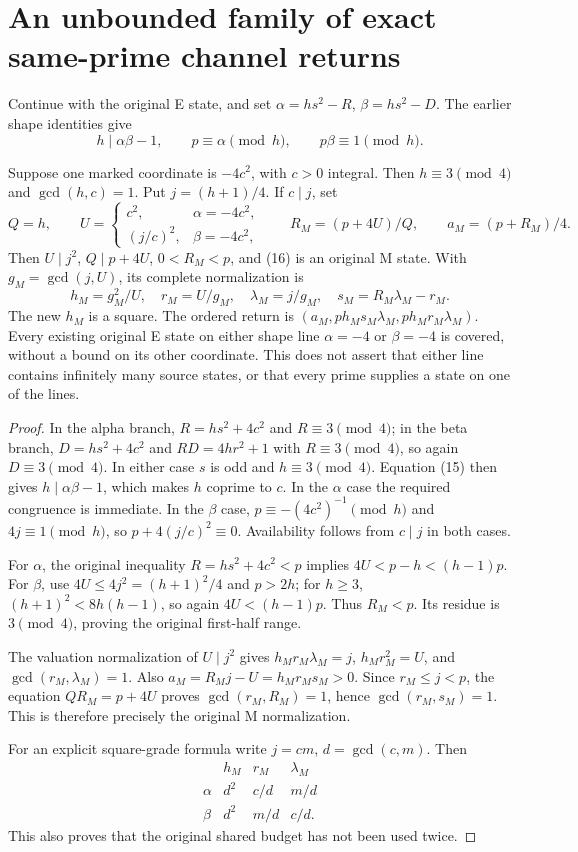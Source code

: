 \section{An unbounded family of exact same-prime channel returns}
Continue with the original E state, and set
$\alpha=hs^2-R$, $\beta=hs^2-D$. The earlier shape identities give
\[
 h\mid\alpha\beta-1,\qquad p\equiv\alpha\pmod h,
 \qquad p\beta\equiv1\pmod h.                         \tag{15}
\]
\begin{theorem}\label{thm:transfer}
Suppose one marked coordinate is $-4c^2$, with $c>0$ integral. Then
$h\equiv3\pmod4$ and $\gcd(h,c)=1$. Put $j=(h+1)/4$.
If $c\mid j$, set
\[
 Q=h,\qquad
 U=\begin{cases}c^2,&\alpha=-4c^2,\\(j/c)^2,&\beta=-4c^2,\end{cases}
 \qquad R_M=(p+4U)/Q,\qquad a_M=(p+R_M)/4.              \tag{16}
\]
Then $U\mid j^2$, $Q\mid p+4U$, $0<R_M<p$, and (16) is an original M state.
With $g_M=\gcd(j,U)$, its complete normalization is
\[
 \boxed{h_M=g_M^2/U,\quad r_M=U/g_M,\quad
 \lambda_M=j/g_M,\quad s_M=R_M\lambda_M-r_M.}           \tag{17}
\]
The new $h_M$ is a square. The ordered return is
$(a_M,ph_Ms_M\lambda_M,ph_Mr_M\lambda_M)$.
Every existing original E state on either shape line $\alpha=-4$ or
$\beta=-4$ is covered, without a bound on its other coordinate.  This does not
assert that either line contains infinitely many source states, or that every
prime supplies a state on one of the lines.
\end{theorem}
\begin{proof}
In the alpha branch, $R=hs^2+4c^2$ and $R\equiv3\pmod4$; in the beta
branch, $D=hs^2+4c^2$ and $RD=4hr^2+1$ with $R\equiv3\pmod4$, so again
$D\equiv3\pmod4$.  In either case $s$ is odd and $h\equiv3\pmod4$.
Equation (15) then gives $h\mid\alpha\beta-1$, which makes $h$ coprime to
$c$.
In the $\alpha$ case the required congruence is immediate.
In the $\beta$ case, $p\equiv-(4c^2)^{-1}\pmod h$ and $4j\equiv1\pmod h$,
so $p+4(j/c)^2\equiv0$. Availability follows from $c\mid j$ in both cases.

For $\alpha$, the original inequality $R=hs^2+4c^2<p$ implies
$4U<p-h<(h-1)p$. For $\beta$, use
$4U\le4j^2=(h+1)^2/4$ and $p>2h$; for $h\ge3$,
$(h+1)^2<8h(h-1)$, so again $4U<(h-1)p$.
Thus $R_M<p$. Its residue is $3\pmod4$, proving the original first-half range.

The valuation normalization of $U\mid j^2$ gives $h_Mr_M\lambda_M=j$,
$h_Mr_M^2=U$, and $\gcd(r_M,\lambda_M)=1$. Also
$a_M=R_Mj-U=h_Mr_Ms_M>0$.
Since $r_M\le j<p$, the equation $QR_M=p+4U$ proves
$\gcd(r_M,R_M)=1$, hence $\gcd(r_M,s_M)=1$.
This is therefore precisely the original M normalization.

For an explicit square-grade formula write \(j=cm\), \(d=\gcd(c,m)\).  Then
\[
 \begin{array}{c|ccc}
   &h_M&r_M&\lambda_M\\ \hline
  \alpha&d^2&c/d&m/d\\
  \beta&d^2&m/d&c/d.
 \end{array}
\]
This also proves that the original shared budget has not been used twice.
\end{proof}

